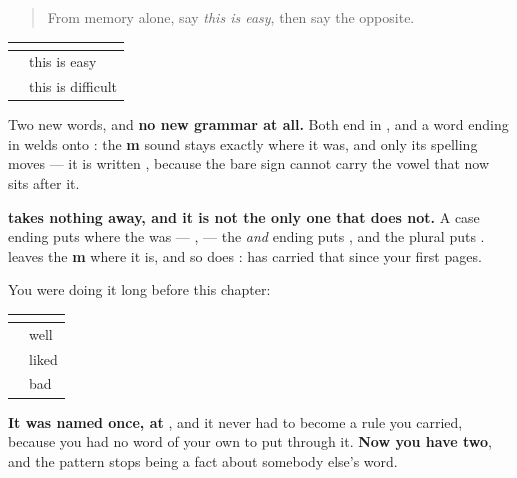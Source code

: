 \label{lesson:ML-R96-ease-recall}



\begin{quote}
From memory alone, say \emph{this is easy}, then say the opposite.
\end{quote}

\begin{grammarlens}[title={Grammar Lens: the welding was already yours}]
\noindent
\begin{tabularx}{\linewidth}{@{}>{\raggedright\arraybackslash}X>{\raggedright\arraybackslash}X@{}}
\toprule
\textbf{} & \textbf{} \\
\midrule
\textbf{\ml{ഇത്} \ml{എളുപ്പമാണ്}} & this is easy \\
\textbf{\ml{ഇത്} \ml{പ്രയാസമാണ്}} & this is difficult \\
\bottomrule
\end{tabularx}

Two new words, and \textbf{no new grammar at all.} Both end in \textbf{}, and a word ending in \textbf{} welds onto \textbf{}: the \textbf{m} sound stays exactly where it was, and only its spelling moves — it is written \textbf{}, because the bare sign cannot carry the vowel that now sits after it.

\textbf{ takes nothing away, and it is not the only one that does not.} A case ending puts \textbf{} where the \textbf{} was — \textbf{}, \textbf{} — the \emph{and} ending puts \textbf{}, and the plural puts \textbf{}. \textbf{} leaves the \textbf{m} where it is, and so does \textbf{}: \textbf{} has carried that \textbf{} since your first pages.

You were doing it long before this chapter:

\noindent
\begin{tabularx}{\linewidth}{@{}>{\raggedright\arraybackslash}X>{\raggedright\arraybackslash}X@{}}
\toprule
\textbf{} & \textbf{} \\
\midrule
\textbf{\ml{സുഖമാണ്}} & well \\
\textbf{\ml{ഇഷ്ടമാണ്}} & liked \\
\textbf{\ml{മോശമാണ്}} & bad \\
\bottomrule
\end{tabularx}

\textbf{It was named once, at }, and it never had to become a rule you carried, because you had no word of your own to put through it. \textbf{Now you have two}, and the pattern stops being a fact about somebody else's word.
\end{grammarlens}

